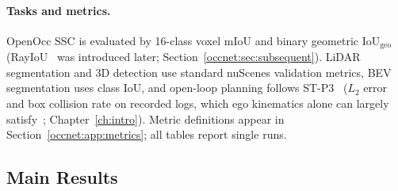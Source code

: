\paragraph{Tasks and metrics.} OpenOcc SSC is evaluated by 16-class voxel mIoU and binary geometric $\text{IoU}_{\text{geo}}$ (RayIoU~\cite{liu2024sparseocc} was introduced later; Section~\ref{occnet:sec:subsequent}). LiDAR segmentation and 3D detection use standard nuScenes validation metrics, BEV segmentation uses class IoU, and open-loop planning follows ST-P3~\cite{hu2022stp3} ($L_2$ error and box collision rate on recorded logs, which ego kinematics alone can largely satisfy~\cite{zhai2023rethinking,li2024ego}; Chapter~\ref{ch:intro}). Metric definitions appear in Section~\ref{occnet:app:metrics}; all tables report single runs.

\subsection{Main Results}\label{occnet:sec:main_results}

